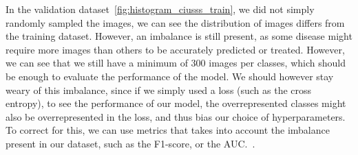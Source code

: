 \documentclass[11pt]{article}
\begin{document}
    In the validation dataset~\ref{fig:histogram_ciusss_train}, we did not simply randomly sampled the images, we can
    see the distribution of images differs from the training dataset. However, an imbalance is still present, as some
    disease might require more images than others to be accurately predicted or treated. However, we can see that we
    still have a minimum of 300 images per classes, which should be enough to evaluate the performance of the model.
    We should however stay weary of this imbalance, since if we simply used a loss (such as the cross entropy), to
    see the performance of our model, the overrepresented classes might also be overrepresented in the loss, and thus
    bias our choice of hyperparameters. To correct for this, we can use metrics that takes into account the imbalance
    present in our dataset, such as the F1-score, or the AUC.~\cite{metrics}.
\newpage
\end{document}
